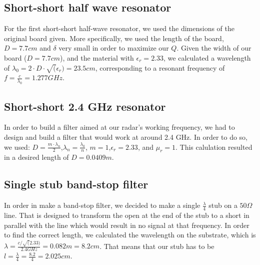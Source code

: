 \documentclass[letterpaper, 12pt]{article}
\begin{document}
\subsection{Short-short half wave resonator}
For the first short-short half-wave resonator, we used the dimensions of the original board given. More specifically, we used the length of the board, $D=7.7cm$ and $\delta$ very small in order to maximize our $Q$. Given the width of our board ($D=7.7cm$), and the material with $\epsilon_r=2.33$, we calculated a wavelength of \(\lambda_0=2\cdot D \cdot\sqrt(\epsilon_r)=23.5cm\), corresponding to a resonant frequency of $f=\frac{c}{\lambda_0}=1.277GHz$.

\subsection{Short-short 2.4 GHz resonator}
In order to build a filter aimed at our radar's working frequency, we had to design and build a filter that would work at around 2.4 GHz. In order to do so, we used: \(D=\frac{m\cdot\lambda_n}{2}\),\(\lambda_n=\frac{\lambda_0}{n}\), \(m=1\),\(\epsilon_r=2.33\), and \(\mu_r=1\). This calulation resulted in a desired length of \(D=0.0409m\).


\subsection{Single stub band-stop filter}
In order in make a band-stop filter, we decided to make a single \(\frac{\lambda}{4}\) stub on a \(50 \Omega\) line. That is designed to transform the open at the end of the stub to a short in parallel with the line which would result in no signal at that frequency. In order to find the correct length, we calculated the wavelength on the substrate, which is \(\lambda=\frac{c/\sqrt(2.33)}{2.4GHz}=0.082m=8.2cm\). That means that our stub has to be \(l=\frac{\lambda}{4}=\frac{8.2}{4}=2.025cm\).
\end{document}
